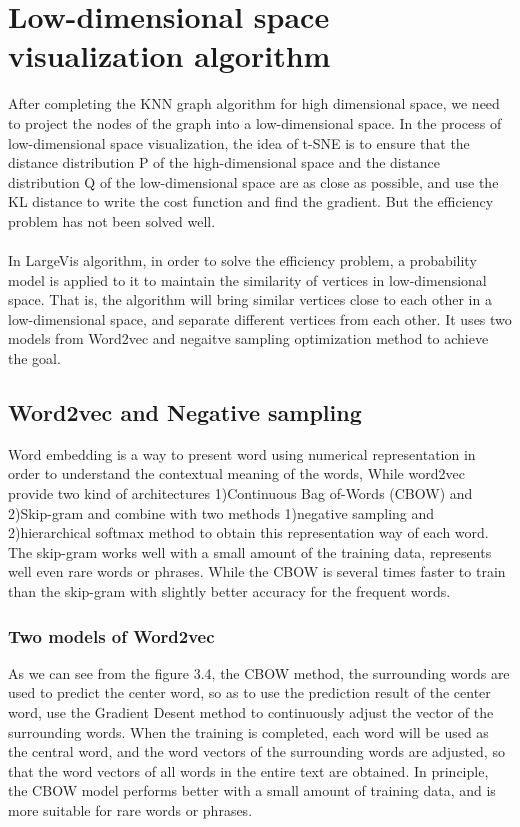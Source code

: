 \section{Low-dimensional space visualization algorithm}

\noindent After completing the KNN graph algorithm for high dimensional space, we need to project the nodes of the graph into a low-dimensional space. In the process of low-dimensional space visualization, the idea of t-SNE is to ensure that the distance distribution P of the high-dimensional space and the distance distribution Q of the low-dimensional space are as close as possible, and use the KL distance to write the cost function and find the gradient. But the efficiency problem has not been solved well.\\
\\

\noindent In LargeVis algorithm, in order to solve the efficiency problem, a probability model is applied to it to maintain the similarity of vertices in low-dimensional space. That is, the algorithm will bring similar vertices close to each other in a low-dimensional space, and separate different vertices from each other. It uses two models from Word2vec and negaitve sampling optimization method to achieve the goal.

\subsection{Word2vec and Negative sampling}
Word embedding is a way to present word using numerical representation in order to understand the contextual meaning of the words, While word2vec provide two kind of architectures 1)Continuous Bag of-Words (CBOW) and 2)Skip-gram and combine with two methods 1)negative sampling and 2)hierarchical softmax method to obtain this representation way of each word. The skip-gram works well with a small amount of the training data, represents well even rare words or phrases. While the CBOW is several times faster to train than the skip-gram with slightly better accuracy for the frequent words.

\subsubsection{Two models of Word2vec}

\noindent As we can see from the figure 3.4, the CBOW method, the surrounding words are used to predict the center word, so as to use the prediction result of the center word, use the Gradient Desent method to continuously adjust the vector of the surrounding words. When the training is completed, each word will be used as the central word, and the word vectors of the surrounding words are adjusted, so that the word vectors of all words in the entire text are obtained. In principle, the CBOW model performs better with a small amount of training data, and is more suitable for rare words or phrases.\\

